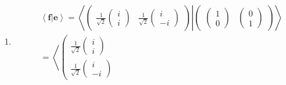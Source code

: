 \documentclass[aps,preprint]{revtex4}
\begin{document}
\begin{enumerate}
\begin{eqnarray}
\begin{array}{c}
i%
\end{array}%
\right) \right\rangle \left\langle \left( 
\begin{array}{c}
1 \\ 
0%
\end{array}%
\right) \right\vert +\left\vert \frac{1}{\sqrt{2}}\left( 
\begin{array}{c}
i \\ 
-i%
\end{array}%
\right) \right\rangle \left\langle \left( 
\begin{array}{c}
0 \\ 
1%
\end{array}%
\right) \right\vert
\end{eqnarray}

\item 
\begin{gather}
\left\langle \left. \boldsymbol{f}\right\vert \boldsymbol{e}\right\rangle
=\left\langle \left. \left( 
\begin{array}{cc}
\frac{1}{\sqrt{2}}\left( 
\begin{array}{c}
i \\ 
i%
\end{array}%
\right) & \frac{1}{\sqrt{2}}\left( 
\begin{array}{c}
i \\ 
-i%
\end{array}%
\right)%
\end{array}%
\right) \right\vert \left( 
\begin{array}{cc}
\left( 
\begin{array}{c}
1 \\ 
0%
\end{array}%
\right) & \left( 
\begin{array}{c}
0 \\ 
1%
\end{array}%
\right)%
\end{array}%
\right) \right\rangle \\
=\left\langle \left( 
\begin{array}{c}
\frac{1}{\sqrt{2}}\left( 
\begin{array}{c}
i \\ 
i%
\end{array}%
\right) \\ 
\frac{1}{\sqrt{2}}\left( 
\begin{array}{c}
i \\ 
-i%
\end{array}%
\right)%
\end{array}%

\end{gather}
\end{enumerate}
\end{document}
